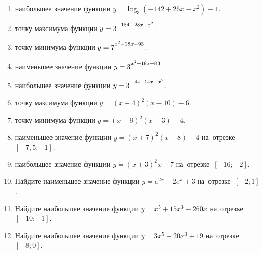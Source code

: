 \documentclass[a4paper,10pt]{article}
\begin{document}
\begin{enumerate}
\item {} наибольшее значение функции $y=\log_3\left(-142+26x-x^2\right)-1$.

\item {} точку максимума функции $y=3\strut^{-184-28x-x^2}$.

\item {} точку минимума функции $y=7\strut^{x^2-18x+93}$.

\item {} наименьшее значение функции $y=3\strut^{x^2+18x+83}$.

\item {} наибольшее значение функции $y=3\strut^{-44-14x-x^2}$.

\item {} точку максимума функции $y=\left(x-4\right)^2\left(x-10\right)-6$.

\item {} точку минимума функции $y=\left(x-9\right)^2\left(x-3\right)-4$.

\item {} наименьшее значение функции $y=\left(x+7\right)^2\left(x+8\right)-4$ на~отрезке~$\left[-7{,}5;-1\right]$.

\item {} наибольшее значение функции $y=\left(x+3\right)^2x+7$ на~отрезке~$\left[-16;-2\right]$.

\item Найдите наименьшее значение функции $y=e^{2x}-2e^x+3$ на~отрезке~$\left[-2;1\right]$.

\item Найдите наибольшее значение функции $y=x^5+15x^3-260x$ на~отрезке~$\left[-10;-1\right]$.

\item Найдите наибольшее значение функции $y=3x^5-20x^3+19$ на~отрезке~$\left[-8;0\right]$.

\end{enumerate}
\end{document}
